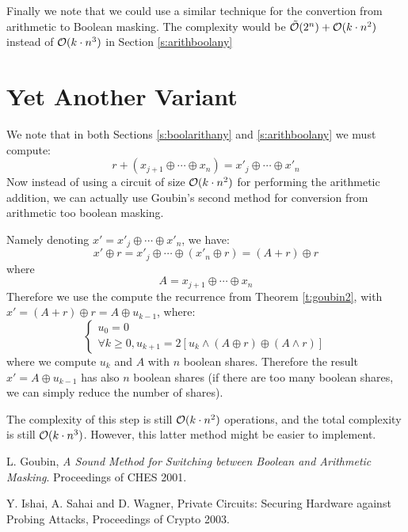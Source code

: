 \documentclass[11pt]{llncs}
\begin{document}
Finally we note that we could use a similar technique for the
convertion from arithmetic to Boolean masking. The complexity would
be  $\tilde{ \cal
  O}(2^n)+ {\cal O}(k \cdot n^2)$ instead of ${\cal O}(k \cdot n^3)$ in Section
\ref{s:arithboolany}

\section{Yet Another Variant}

We note that in both Sections \ref{s:boolarithany} and
\ref{s:arithboolany} we must compute:
$$ r+ (x_{j+1} \oplus  \cdots \oplus x_n)=x'_{j} \oplus \cdots
\oplus x'_n$$
Now instead of using a circuit of size ${\cal O}(k \cdot n^2)$ for
performing the arithmetic addition, we 
 can actually use Goubin's second method for conversion from
 arithmetic too boolean masking.

Namely denoting $x'=x'_{j} \oplus \cdots
\oplus x'_n$, we have:
$$x' \oplus r=x'_{j} \oplus \cdots
\oplus (x'_n \oplus r)=(A+r) \oplus r$$
where 
$$A=x_{j+1} \oplus  \cdots \oplus x_n$$
Therefore we use the compute the  recurrence from Theorem
\ref{t:goubin2}, with $x'=(A+r) \oplus r=A \oplus u_{k-1}$, where:
$$\left\{
\begin{array}{l}
u_0=0 \\
\forall k \geq 0, u_{k+1}=2 [u_k \wedge (A \oplus r) \oplus (A \wedge
  r) ]
\end{array}
\right.
$$
where we compute $u_k$ and $A$ with $n$ boolean shares. Therefore the
result $x' =A \oplus u_{k-1}$ has also $n$ boolean shares (if there
are too many boolean shares, we can simply reduce the number of
shares). 

The complexity of this step is still ${\cal O}(k \cdot n^2)$
operations, and the total complexity is still ${\cal O}(k \cdot
n^3)$. However, this latter method might be easier to implement.


\begin{thebibliography}{30}
L. Goubin, {\sl A Sound Method for Switching between Boolean and
  Arithmetic Masking}. Proceedings of CHES 2001.

Y. Ishai, A. Sahai and D. Wagner, 
{Private Circuits: Securing Hardware against Probing Attacks},
Proceedings of Crypto 2003.

\end{thebibliography}
\end{document}
